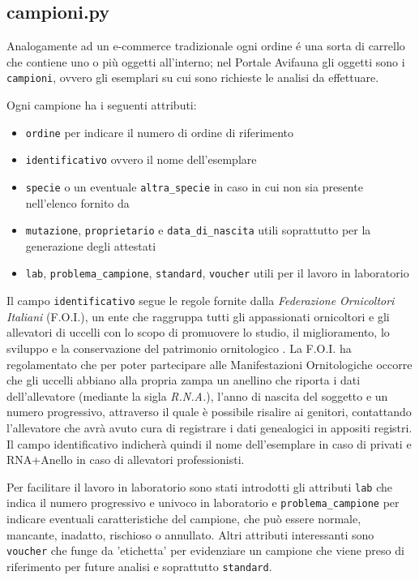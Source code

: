 \subsection*{campioni.py}
\label{subs:campioni}
Analogamente ad un e-commerce tradizionale ogni ordine é una sorta di carrello che contiene uno o più oggetti all'interno; nel Portale Avifauna gli oggetti sono i \texttt{campioni}, ovvero gli esemplari su cui sono richieste le analisi da effettuare.

Ogni campione ha i seguenti attributi:
\begin{itemize}
 \item \texttt{ordine} per indicare il numero di ordine di riferimento
 \item \texttt{identificativo} ovvero il nome dell'esemplare
 \item \texttt{specie} o un eventuale \texttt{altra\_specie} in caso in cui non sia presente nell'elenco fornito da {\fem}
 \item \texttt{mutazione}, \texttt{proprietario} e \texttt{data\_di\_nascita} utili soprattutto per la generazione degli attestati
 \item \texttt{lab}, \texttt{problema\_campione}, \texttt{standard}, \texttt{voucher} utili per il lavoro in laboratorio
\end{itemize} 

Il campo \texttt{identificativo} segue le regole fornite dalla \emph{Federazione Ornicoltori Italiani} (F.O.I.), un ente che raggruppa tutti gli appassionati ornicoltori e gli allevatori di uccelli con lo scopo di promuovere lo studio, il miglioramento, lo sviluppo e la conservazione del patrimonio ornitologico \cite{foi}. La F.O.I. ha regolamentato che per poter partecipare alle Manifestazioni Ornitologiche occorre che gli uccelli abbiano alla propria zampa un anellino che riporta i dati dell'allevatore (mediante la sigla \emph{R.N.A.}), l'anno di nascita del soggetto e un numero progressivo, attraverso il quale è possibile risalire ai genitori, contattando l'allevatore che avrà avuto cura di registrare i dati genealogici in appositi registri. Il campo identificativo indicherà quindi il nome dell'esemplare in caso di privati e RNA+Anello in caso di allevatori professionisti.

Per facilitare il lavoro in laboratorio sono stati introdotti gli attributi \texttt{lab} che indica il numero progressivo e univoco in laboratorio e \texttt{problema\_campione} per indicare eventuali caratteristiche del campione, che può essere normale, mancante, inadatto, rischioso o annullato. Altri attributi interessanti sono \texttt{voucher} che funge da 'etichetta' per evidenziare un campione che viene preso di riferimento per future analisi e soprattutto \texttt{standard}.

